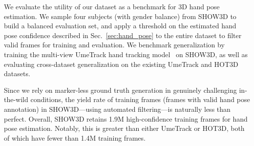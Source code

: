\documentclass[10pt,twocolumn,letterpaper]{article}
\begin{document}
\begin{table}[t]
\centering
{}%
\caption{\textbf{Evaluation of 3D hand pose estimation.} The reported metric is Mean Keypoint Position Error (MKPE, in mm). Models trained on existing datasets, UmeTrack~\cite{han2022umetrack} and HOT3D~\cite{banerjee2025hot3d}, generalize noticeably worse to SHOW3D, highlighting the increased difficulty of in-the-wild data.
}
\label{tab:cross_hands}
\end{table}

We evaluate the utility of our dataset as a benchmark for 3D hand pose estimation. 
We sample four subjects (with gender balance) from SHOW3D to build a balanced evaluation set, and apply a threshold on the estimated hand pose confidence described in Sec.~\ref{sec:hand_pose} to the entire dataset to filter valid frames for training and evaluation.
We benchmark generalization by training the multi-view UmeTrack hand tracking model~\cite{han2022umetrack} on 
SHOW3D, as well as evaluating cross-dataset generalization on the existing UmeTrack and HOT3D datasets.

Since we rely on marker-less ground truth generation in genuinely challenging in-the-wild conditions, the yield rate of training frames (\ie frames with valid hand pose annotation) in SHOW3D---using automated filtering---is naturally less than perfect.
Overall, SHOW3D retains 1.9M high-confidence training frames for hand pose estimation. Notably, this is greater than either UmeTrack or HOT3D, both of which have fewer than 1.4M training frames.
\end{document}
